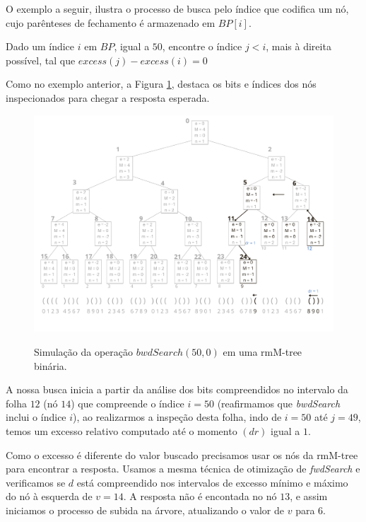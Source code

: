     \newpage
    O exemplo a seguir, ilustra o processo de busca pelo índice que codifica um nó, cujo parênteses de fechamento é armazenado em $BP[i]$.
    \begin{example}\label{ex:bin-bwd}
        Dado um índice $i$ em $BP$, igual a $50$, encontre o índice $j<i$, mais à direita possível, tal que $excess(j) - excess(i) = 0$


        Como no exemplo anterior, a Figura \ref{fig:bin-bwdSearch}, destaca os bits e índices dos nós inspecionados para chegar a resposta esperada.
        \begin{figure}[h!]
           \centering
             \caption[bwdSearch(50,0).]{Simulação da operação $bwdSearch(50,0)$ em uma rmM-tree binária.}
             \includegraphics[width=\columnwidth]{images/rmm-tree-bin-bwdsearch.png}
             \label{fig:bin-bwdSearch}
        \end{figure}

        A nossa busca inicia a partir da análise dos bits compreendidos no intervalo da folha $12$ (nó $14$) que compreende o índice $i=50$ (reafirmamos que \textit{bwdSearch} inclui o índice $i$), ao realizarmos a inspeção desta folha, indo de $i=50$ até $j=49$, temos um excesso relativo computado até o momento $(dr)$ igual a $1$. 
        
        Como o excesso é diferente do valor buscado precisamos usar os nós da rmM-tree para encontrar a resposta. Usamos a mesma técnica de otimização de \textit{fwdSearch} e verificamos se $d$ está compreendido nos intervalos de excesso mínimo e máximo do nó à esquerda de $v=14$. A resposta não é encontada no nó $13$, e assim iniciamos o processo de subida na árvore, atualizando o valor de $v$ para $6$.
        

\end{example}
